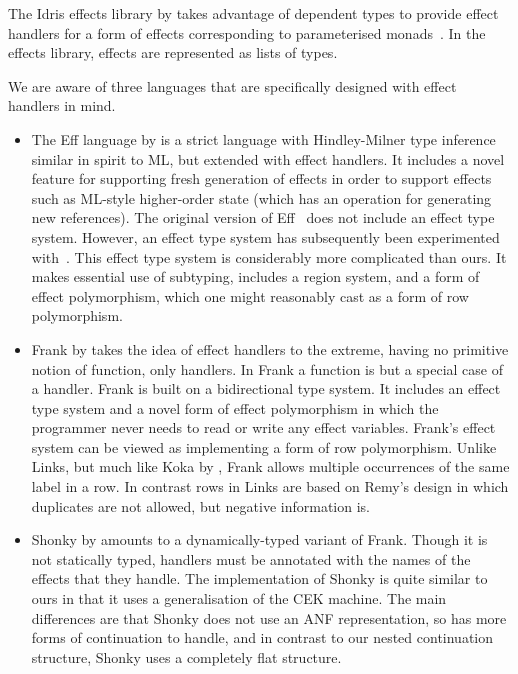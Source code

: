 \documentclass[12pt,mscres,cdtppar,twoside,openright,logo,rightchapter,normalheadings]{infthesis}
\theoremstyle{definition}
\begin{document}
The Idris effects library by \cite{Brady2013} takes advantage of
dependent types to provide effect handlers for a form of effects
corresponding to parameterised monads~\citep{Atkey09}.
%
In the effects library, effects are represented as lists of types.

We are aware of three languages that are specifically designed with
effect handlers in mind.
%
\begin{itemize}
\item The Eff language by \cite{Bauer2015} is a strict language with
  Hindley-Milner type inference similar in spirit to ML, but extended
  with effect handlers.
%
It includes a novel feature for supporting fresh generation of effects
in order to support effects such as ML-style higher-order state (which
has an operation for generating new references).
%
The original version of Eff~\citep{Bauer2015} does not include an
effect type system. However, an effect type system has subsequently
been experimented with~\citep{BauerP13, Pretnar2014}.
%
This effect type system is considerably more complicated than ours. It
makes essential use of subtyping, includes a region system, and a form
of effect polymorphism, which one might reasonably cast as a form of
row polymorphism.

\item Frank by \cite{McBride2014} takes the idea of effect handlers to
  the extreme, having no primitive notion of function, only
  handlers. In Frank a function is but a special case of a handler.
  Frank is built on a bidirectional type system. It includes an effect
  type system and a novel form of effect polymorphism in which the
  programmer never needs to read or write any effect
  variables. Frank's effect system can be viewed as implementing a
  form of row polymorphism. Unlike Links, but much like
  Koka by \cite{Leijen14}, Frank allows multiple occurrences of the same
  label in a row. In contrast rows in Links are based on Remy's design
  in which duplicates are not allowed, but negative information is.

\item Shonky by \cite{McBride2016} amounts to a dynamically-typed variant
  of Frank. Though it is not statically typed, handlers must be
  annotated with the names of the effects that they handle. The
  implementation of Shonky is quite similar to ours in that it uses a
  generalisation of the CEK machine. The main differences are that
  Shonky does not use an ANF representation, so has more forms of
  continuation to handle, and in contrast to our nested continuation
  structure, Shonky uses a completely flat structure.
\end{itemize}
\end{document}
